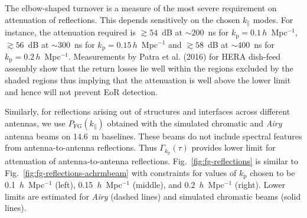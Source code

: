 \documentclass[preprint2,iop,numberedappendix,twocolappendix,appendixfloats]{emulateapj}
\begin{document}
The elbow-shaped turnover is a measure of the most severe requirement on attenuation of reflections. This depends sensitively on the chosen $k_\parallel$ modes. For instance, the attenuation required is $\gtrsim 54$~dB at $\sim 200$~ns for $k_\textrm{p}=0.1\,h$~Mpc$^{-1}$, $\gtrsim 56$~dB at $\sim 300$~ns for $k_\textrm{p}=0.15\,h$~Mpc$^{-1}$ and $\gtrsim 58$~dB at $\sim 400$~ns for $k_\textrm{p}=0.2\,h$~Mpc$^{-1}$. Measurements by Patra et al. (2016) for HERA dish-feed assembly show that the return losses lie well within the regions excluded by the shaded regions thus implying that the attenuation is well above the lower limit and hence will not prevent EoR detection.

Similarly, for reflections arising out of structures and interfaces across different antennas, we use $P_\textrm{FG}(k_\parallel)$ obtained with the simulated chromatic and {\it Airy} antenna beams on 14.6~m baselines. These beams do not include spectral features from antenna-to-antenna reflections. Thus $\Gamma_{k_\textrm{p}}(\tau)$ provides lower limit for attenuation of antenna-to-antenna reflections. Fig.~\ref{fig:fg-reflections} is similar to Fig.~\ref{fig:fg-reflections-achrmbeam} with constraints for values of $k_\textrm{p}$ chosen to be 0.1~$h$~Mpc$^{-1}$ (left), 0.15~$h$~Mpc$^{-1}$ (middle), and 0.2~$h$~Mpc$^{-1}$ (right). Lower limits are estimated for {\it Airy} (dashed lines) and simulated chromatic beams (solid lines).
\end{document}
